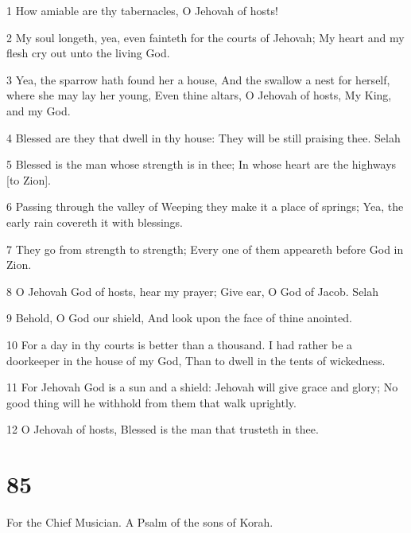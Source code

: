\par 1 How amiable are thy tabernacles, O Jehovah of hosts!
\par 2 My soul longeth, yea, even fainteth for the courts of Jehovah; My heart and my flesh cry out unto the living God.
\par 3 Yea, the sparrow hath found her a house, And the swallow a nest for herself, where she may lay her young, Even thine altars, O Jehovah of hosts, My King, and my God.
\par 4 Blessed are they that dwell in thy house: They will be still praising thee. Selah
\par 5 Blessed is the man whose strength is in thee; In whose heart are the highways [to Zion].
\par 6 Passing through the valley of Weeping they make it a place of springs; Yea, the early rain covereth it with blessings.
\par 7 They go from strength to strength; Every one of them appeareth before God in Zion.
\par 8 O Jehovah God of hosts, hear my prayer; Give ear, O God of Jacob. Selah
\par 9 Behold, O God our shield, And look upon the face of thine anointed.
\par 10 For a day in thy courts is better than a thousand. I had rather be a doorkeeper in the house of my God, Than to dwell in the tents of wickedness.
\par 11 For Jehovah God is a sun and a shield: Jehovah will give grace and glory; No good thing will he withhold from them that walk uprightly.
\par 12 O Jehovah of hosts, Blessed is the man that trusteth in thee.

\chapter{85}

\par For the Chief Musician. A Psalm of the sons of Korah.

